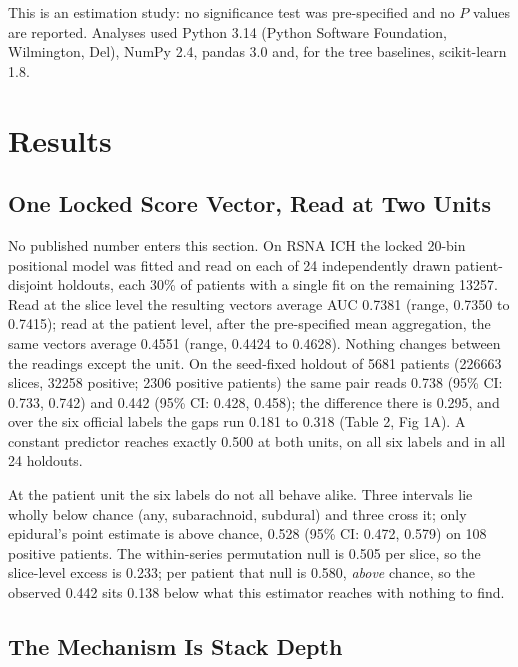 \documentclass[11pt,letterpaper]{article}
\begin{document}
This is an estimation study: no significance test was pre-specified and no $P$
values are reported. Analyses used Python 3.14 (Python Software Foundation, Wilmington, Del), NumPy
2.4, pandas 3.0 and, for the tree baselines, scikit-learn 1.8.

\section*{Results}

\subsection*{One Locked Score Vector, Read at Two Units}

No published number enters this section. On RSNA ICH the locked 20-bin
positional model was fitted and read on each of 24 independently drawn
patient-disjoint holdouts, each 30\% of patients with a single fit on the
remaining \num{13257}. Read at the slice level the resulting vectors
average AUC 0.7381 (range, 0.7350 to 0.7415); read at the patient level, after
the pre-specified mean aggregation, the same vectors average 0.4551 (range,
0.4424 to 0.4628). Nothing changes between the readings except the unit. On the
seed-fixed holdout of \num{5681} patients (\num{226663} slices, \num{32258}
positive; \num{2306} positive patients) the same pair reads 0.738 (95\% CI:
0.733, 0.742) and 0.442 (95\% CI: 0.428, 0.458); the difference there is 0.295,
and over the six official labels the gaps run 0.181 to 0.318 (Table 2, Fig 1A).
A constant predictor reaches exactly 0.500 at both units, on all six labels and
in all 24 holdouts.

At the patient unit the six labels do not all behave alike. Three intervals lie
wholly below chance (any, subarachnoid, subdural) and three cross it; only
epidural's point estimate is above chance, 0.528 (95\% CI: 0.472,
0.579) on 108 positive patients. The within-series permutation null is 0.505 per
slice, so the slice-level excess is 0.233; per patient that null is 0.580,
\emph{above} chance, so the observed 0.442 sits 0.138 below what this estimator
reaches with nothing to find.

\subsection*{The Mechanism Is Stack Depth}
\end{document}
